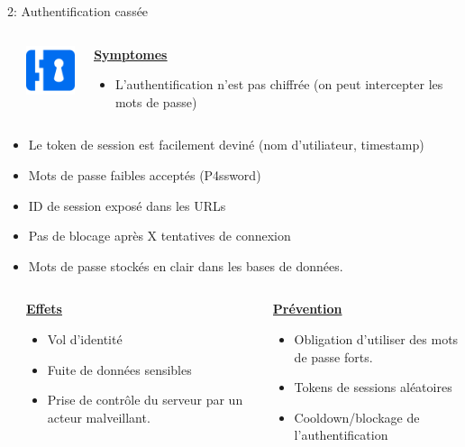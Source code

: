 \documentclass[final,hyperref={pdfpagelabels=false}]{beamer}
\begin{document}
\begin{frame}[t]
\begin{columns}[t]
\begin{column}{.465\textwidth}
\begin{block}{2: Authentification cassée}
\begin{columns}[T]
			\begin{column}{.01\textwidth}
			\end{column}
			\begin{column}{.115\textwidth} %
				\includegraphics[scale=2.3]{rimlock.png}
			\end{column}

			\begin{column}{.875\textwidth}
				\uline{\uline{\textbf{Symptomes}}}
				\begin{itemize}
					\item L'authentification n'est pas chiffrée (on peut intercepter les mots de passe)
				\end{itemize}
			\end{column}
		\end{columns}
		\begin{itemize}
			\item Le token de session est facilement deviné (nom d'utiliateur, timestamp)
			\item Mots de passe faibles acceptés (P4ssword)
			\item ID de session exposé dans les URLs
			\item Pas de blocage après X tentatives de connexion
			\item Mots de passe stockés en clair dans les bases de données.
		\end{itemize}
		\begin{columns}[T]
			\begin{column}{.01\textwidth}
			\end{column}
			\begin{column}{0.495\textwidth}
				\vfill
				\uline{\textbf{Effets}}
				\begin{itemize}
					\item Vol d'identité
					\item Fuite de données sensibles
					\item Prise de contrôle du serveur par un acteur malveillant.
				\end{itemize}
				\vfill
			\end{column}
			\begin{column}{0.495\textwidth}
				\vfill
				\uline{\textbf{Prévention}}
				\begin{itemize}
					\item Obligation d'utiliser des mots de passe forts.
					\item Tokens de sessions aléatoires
					\item Cooldown/blockage de l'authentification
				\end{itemize}
			\end{column}
		\end{columns}



\end{block}
\end{column}
\end{columns}
\end{frame}
\end{document}
